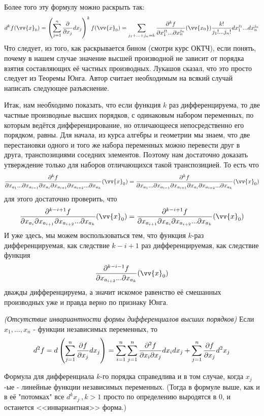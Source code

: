 \begin{addition}
	Более того эту формулу можно раскрыть так:
	\[
		d^k f(\vv{x}_0) = \left(\suml_{j = 1}^n \pd{}{x_j} dx_j\right)^k f(\vv{x}_0) 
		= 
		\suml_{j_1 +...+j_n = k}\frac{\vdelta^k f}{\vdelta x_1^{j_1}...\vdelta x_n^{j_n}}(\vv{x_0})\frac{k!}{j_1!...j_n!}dx_1^{j_1}...dx_n^{j_n}
	\]
	Что следует, из того, как раскрывается бином (смотри курс ОКТЧ), если понять, почему в нашем случае значение высшей производной не зависит от порядка взятия составляющих её частных производных. Лукашов сказал, что это просто следует из  Теоремы Юнга. Автор считает необходимым на всякий случай написать следующее разъяснение.
	\begin{anote}
		Итак, нам необходимо показать, что если функция $k$ раз дифференцируема, то две частные производные высших порядков, с одинаковым набором переменных, по которым ведётся дифференцирование, но отличающееся непосредственно его порядком, равны. Для начала, из курса алгебры и геометрии мы знаем, что две перестановки одного и того же набора переменных можно перевести друг в друга, транспозициями соседних элементов. Поэтому нам достаточно доказать утверждение только для наборов отличающихся такой транспозицией. То есть что
		\[
			\frac{\vdelta^k f}{\vdelta x_{a_1}...\vdelta x_{a_{i-1}}\vdelta x_{a_i}\vdelta x_{a_{i+1}}\vdelta x_{a_{i+2}}...\vdelta x_{a_k}} (\vv{x}_0)
			=
			\frac{\vdelta^k f}{\vdelta x_{a_1}...\vdelta x_{a_{i-1}}\vdelta x_{a_{i+1}}\vdelta x_{a_{i}}\vdelta x_{a_{i+2}}...\vdelta x_{a_k}} (\vv{x}_0)
		\] 
		для этого достаточно проверить, что
		\[
			\frac{\vdelta^{k-i+1} f}{\vdelta x_{a_i}\vdelta x_{a_{i+1}}\vdelta x_{a_{i+2}}...\vdelta x_{a_k}} (\vv{x}_0)
			=
			\frac{\vdelta^{k-i+1} f}{\vdelta x_{a_{i+1}}\vdelta x_{a_{i}}\vdelta x_{a_{i+2}}...\vdelta x_{a_k}} (\vv{x}_0)
		\]
		И уже здесь, мы можем воспользоваться тем, что функция $k$-раз дифференцируемая, как следствие $k-i+1$ раз дифференцируемая, как следствие функция
		\[
			\frac{\vdelta^{k-i-1} f}{\vdelta x_{a_{i+2}}...\vdelta x_{a_k}} (\vv{x}_0)
		\]
		дважды дифференцируема, а значит искомое равенство её смешанных производных уже и правда верно по признаку Юнга.
	\end{anote} 
\end{addition}

\begin{note}
	\textit{(Отсутствие инвариантности формы дифференциалов высших порядков)} Если $x_1,..., x_n$ - функции независимых переменных, то
	\[
		d^2f=d\left(\sum\limits_{j = 1}^n \frac{\partial f}{\partial x_j} dx_j\right) = \sum\limits_{i=1}^n \sum\limits_{j = 1}^n \frac{\partial^2 f}{\partial x_i \partial x_j} dx_idx_j + \sum\limits_{j=1}^n \frac{\partial f}{\partial x_j}d^2x_j
	\]
\end{note}

\begin{note}
	Формула для дифференциала $k$-го порядка справедлива и в том случае, когда $x_j$-ые - линейные функции независимых переменных. (Тогда в формуле выше, как и в её "потомках" все $d^kx_j\ , k>1$ просто по определению выродятся в $0$, и останется <<инвариантная>> форма.)
\end{note}